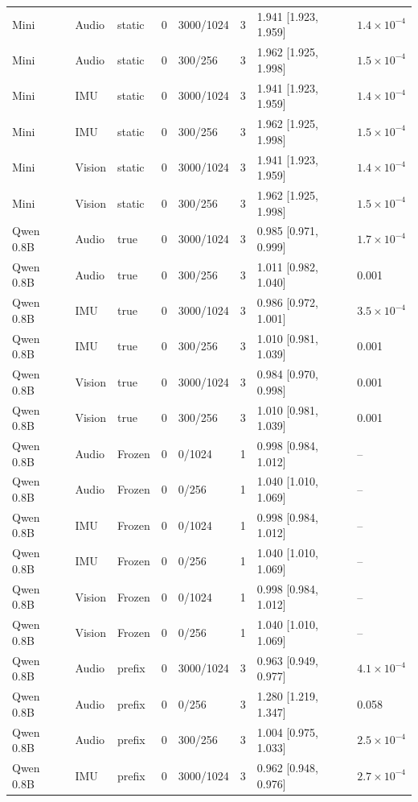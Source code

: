 {\begin{longtable}{@{}llllllll@{}}
Mini & Audio & static & 0 & 3000/1024 & 3 & 1.941 [1.923, 1.959] & $1.4\times10^{-4}$ \\
Mini & Audio & static & 0 & 300/256 & 3 & 1.962 [1.925, 1.998] & $1.5\times10^{-4}$ \\
Mini & IMU & static & 0 & 3000/1024 & 3 & 1.941 [1.923, 1.959] & $1.4\times10^{-4}$ \\
Mini & IMU & static & 0 & 300/256 & 3 & 1.962 [1.925, 1.998] & $1.5\times10^{-4}$ \\
Mini & Vision & static & 0 & 3000/1024 & 3 & 1.941 [1.923, 1.959] & $1.4\times10^{-4}$ \\
Mini & Vision & static & 0 & 300/256 & 3 & 1.962 [1.925, 1.998] & $1.5\times10^{-4}$ \\
Qwen 0.8B & Audio & true & 0 & 3000/1024 & 3 & 0.985 [0.971, 0.999] & $1.7\times10^{-4}$ \\
Qwen 0.8B & Audio & true & 0 & 300/256 & 3 & 1.011 [0.982, 1.040] & 0.001 \\
Qwen 0.8B & IMU & true & 0 & 3000/1024 & 3 & 0.986 [0.972, 1.001] & $3.5\times10^{-4}$ \\
Qwen 0.8B & IMU & true & 0 & 300/256 & 3 & 1.010 [0.981, 1.039] & 0.001 \\
Qwen 0.8B & Vision & true & 0 & 3000/1024 & 3 & 0.984 [0.970, 0.998] & 0.001 \\
Qwen 0.8B & Vision & true & 0 & 300/256 & 3 & 1.010 [0.981, 1.039] & 0.001 \\
Qwen 0.8B & Audio & Frozen & 0 & 0/1024 & 1 & 0.998 [0.984, 1.012] & -- \\
Qwen 0.8B & Audio & Frozen & 0 & 0/256 & 1 & 1.040 [1.010, 1.069] & -- \\
Qwen 0.8B & IMU & Frozen & 0 & 0/1024 & 1 & 0.998 [0.984, 1.012] & -- \\
Qwen 0.8B & IMU & Frozen & 0 & 0/256 & 1 & 1.040 [1.010, 1.069] & -- \\
Qwen 0.8B & Vision & Frozen & 0 & 0/1024 & 1 & 0.998 [0.984, 1.012] & -- \\
Qwen 0.8B & Vision & Frozen & 0 & 0/256 & 1 & 1.040 [1.010, 1.069] & -- \\
Qwen 0.8B & Audio & prefix & 0 & 3000/1024 & 3 & 0.963 [0.949, 0.977] & $4.1\times10^{-4}$ \\
Qwen 0.8B & Audio & prefix & 0 & 0/256 & 3 & 1.280 [1.219, 1.347] & 0.058 \\
Qwen 0.8B & Audio & prefix & 0 & 300/256 & 3 & 1.004 [0.975, 1.033] & $2.5\times10^{-4}$ \\
Qwen 0.8B & IMU & prefix & 0 & 3000/1024 & 3 & 0.962 [0.948, 0.976] & $2.7\times10^{-4}$ \\

\end{longtable}}

